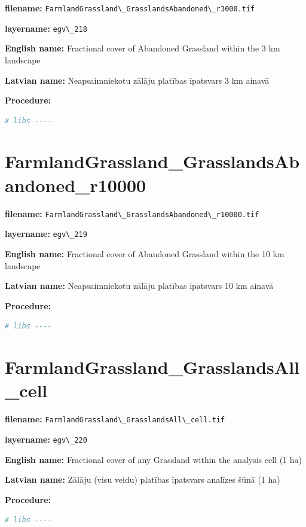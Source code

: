 \documentclass[
]{book}
\newcommand{\passthrough}[1]{#1}
\begin{document}
\textbf{filename:} \passthrough{\lstinline!FarmlandGrassland\_GrasslandsAbandoned\_r3000.tif!}

\textbf{layername:} \passthrough{\lstinline!egv\_218!}

\textbf{English name:} Fractional cover of Abandoned Grassland within the 3 km landscape

\textbf{Latvian name:} Neapsaimniekotu zālāju platības īpatsvars 3 km ainavā

\textbf{Procedure:}

\begin{lstlisting}[language=R]
# libs ----
\end{lstlisting}

\section{FarmlandGrassland\_GrasslandsAbandoned\_r10000}\label{ch06.219}

\textbf{filename:} \passthrough{\lstinline!FarmlandGrassland\_GrasslandsAbandoned\_r10000.tif!}

\textbf{layername:} \passthrough{\lstinline!egv\_219!}

\textbf{English name:} Fractional cover of Abandoned Grassland within the 10 km landscape

\textbf{Latvian name:} Neapsaimniekotu zālāju platības īpatsvars 10 km ainavā

\textbf{Procedure:}

\begin{lstlisting}[language=R]
# libs ----
\end{lstlisting}

\section{FarmlandGrassland\_GrasslandsAll\_cell}\label{ch06.220}

\textbf{filename:} \passthrough{\lstinline!FarmlandGrassland\_GrasslandsAll\_cell.tif!}

\textbf{layername:} \passthrough{\lstinline!egv\_220!}

\textbf{English name:} Fractional cover of any Grassland within the analysis cell (1 ha)

\textbf{Latvian name:} Zālāju (visu veidu) platības īpatsvars analīzes šūnā (1 ha)

\textbf{Procedure:}

\begin{lstlisting}[language=R]
# libs ----
\end{lstlisting}
\end{document}
